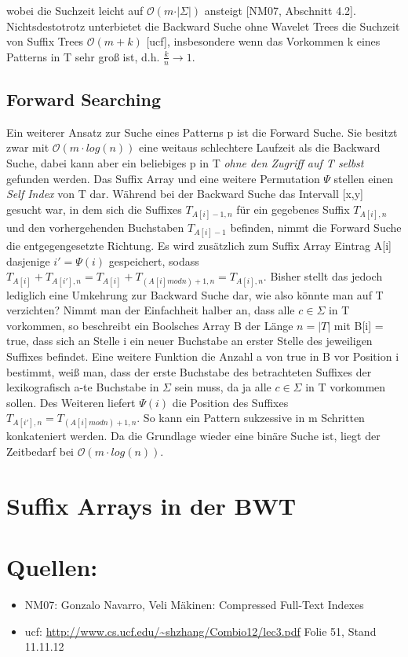 \documentclass[12pt,twoside]{article}
\begin{document}
wobei die Suchzeit leicht auf $\mathcal{O}(m \cdot \vert \Sigma \vert)$ ansteigt [NM07, Abschnitt 4.2]. Nichtsdestotrotz unterbietet die Backward Suche ohne Wavelet Trees die Suchzeit von Suffix Trees $\mathcal{O}(m+k)$ [ucf], insbesondere wenn das Vorkommen k eines Patterns in T sehr groß ist, d.h. $\frac{k}{n} \rightarrow 1$.

\subsection{Forward Searching}
Ein weiterer Ansatz zur Suche eines Patterns p ist die Forward Suche. Sie besitzt zwar mit $\mathcal{O}(m\cdot log(n))$ eine weitaus schlechtere Laufzeit als die Backward Suche, dabei kann aber ein beliebiges p in T \textit{ohne den Zugriff auf T selbst} gefunden werden. Das Suffix Array und eine weitere Permutation $\Psi$ stellen einen \textit{Self Index} von T dar. Während bei der Backward Suche das Intervall [x,y] gesucht war, in dem sich die Suffixes $T_{A[i]-1,n}$ für ein gegebenes Suffix $T_{A[i],n}$ und den vorhergehenden Buchstaben $T_{A[i]-1}$ befinden, nimmt die Forward Suche die entgegengesetzte Richtung. Es wird zusätzlich zum Suffix Array Eintrag A[i] dasjenige $i' = \Psi(i)$ gespeichert, sodass $T_{A[i]} + T_{A[i'],n} = T_{A[i]} + T_{(A[i] mod n)+1,n} = T_{A[i],n}$. Bisher stellt das jedoch lediglich eine Umkehrung zur Backward Suche dar, wie also könnte man auf T verzichten? Nimmt man der Einfachheit halber an, dass alle $c \in \Sigma$ in T vorkommen, so beschreibt ein Boolsches Array B der Länge $n = \vert T \vert$ mit B[i] = true, dass sich an Stelle i ein neuer Buchstabe an erster Stelle des jeweiligen Suffixes befindet. Eine weitere Funktion die Anzahl a von true in B vor Position i bestimmt, weiß man, dass der erste Buchstabe des betrachteten Suffixes der lexikografisch a-te Buchstabe in $\Sigma$ sein muss, da ja alle $c \in \Sigma$ in T vorkommen sollen. Des Weiteren liefert $\Psi(i)$ die Position des Suffixes $T_{A[i'],n} = T_{(A[i] mod n)+1,n}$. So kann ein Pattern sukzessive in m Schritten konkateniert werden. Da die Grundlage wieder eine binäre Suche ist, liegt der Zeitbedarf bei $\mathcal{O}(m\cdot log(n))$.

\section{Suffix Arrays in der BWT}

\section{Quellen:}
\begin{itemize}
\item NM07: Gonzalo Navarro, Veli Mäkinen: Compressed Full-Text Indexes
\item ucf: \url{http://www.cs.ucf.edu/~shzhang/Combio12/lec3.pdf} Folie 51, Stand 11.11.12
\end{itemize}
\end{document}
